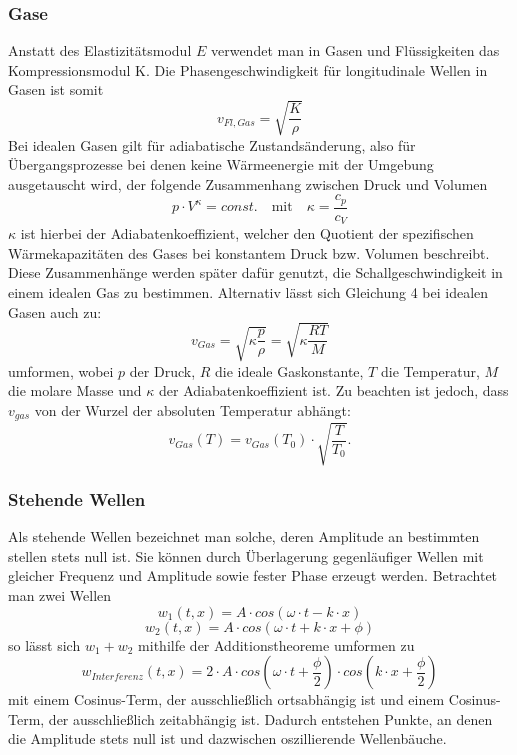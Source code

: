 \documentclass{article}
\begin{document}
\subsubsection{Gase}
Anstatt des Elastizitätsmodul $E$ verwendet man in Gasen und Flüssigkeiten das Kompressionsmodul K. Die Phasengeschwindigkeit für longitudinale Wellen in Gasen ist somit
\begin{equation}
    v_{Fl,Gas} = \sqrt{\frac{K}{\rho}}
\end{equation}
Bei idealen Gasen gilt für adiabatische Zustandsänderung, also für Übergangsprozesse bei denen keine Wärmeenergie mit der Umgebung ausgetauscht wird, der folgende Zusammenhang zwischen Druck und Volumen
\begin{equation}
    p \cdot V^\kappa = const. \quad \textrm{mit} \quad \kappa = \frac{c_{p}}{c_V}
\end{equation}
$\kappa$ ist hierbei der Adiabatenkoeffizient, welcher den Quotient der spezifischen Wärmekapazitäten des Gases bei konstantem Druck bzw. Volumen beschreibt. Diese Zusammenhänge werden später dafür genutzt, die Schallgeschwindigkeit in einem idealen Gas zu bestimmen.
Alternativ lässt sich Gleichung 4 bei idealen Gasen auch zu:
\begin{equation}
    v_{Gas} = \sqrt{\kappa \frac{p}{\rho}} = \sqrt{\kappa \frac{RT}{M}}
\end{equation}
umformen, wobei $p$ der Druck, $R$ die ideale Gaskonstante, $T$ die Temperatur, $M$ die molare Masse und $\kappa$ der Adiabatenkoeffizient ist. Zu beachten ist jedoch, dass $v_{gas}$ von der Wurzel der absoluten Temperatur abhängt:
\begin{equation}
    v_{Gas}(T)= v_{Gas}(T_0) \cdot \sqrt{\frac{T}{T_0}}.
\end{equation}
\subsubsection{Stehende Wellen}
Als stehende Wellen bezeichnet man solche, deren Amplitude an bestimmten stellen stets null ist. Sie können durch Überlagerung gegenläufiger Wellen mit gleicher Frequenz und Amplitude sowie fester Phase erzeugt werden. Betrachtet man zwei Wellen
\begin{equation}
    w_1(t,x) = A \cdot cos(\omega \cdot t - k \cdot x)
\end{equation}
\begin{equation}
    w_2(t,x) = A \cdot cos(\omega \cdot t + k \cdot x + \phi)
\end{equation}
so lässt sich $w_1 + w_2$ mithilfe der Additionstheoreme umformen zu
\begin{equation}
    w_{Interferenz}(t,x) = 2\cdot A \cdot cos(\omega \cdot t + \frac{\phi}{2}) \cdot cos(k \cdot x + \frac{\phi}{2})
\end{equation}
mit einem Cosinus-Term, der ausschließlich ortsabhängig ist und einem Cosinus-Term, der ausschließlich zeitabhängig ist. Dadurch entstehen Punkte, an denen die Amplitude stets null ist und dazwischen oszillierende Wellenbäuche. \cite{1}
\end{document}
